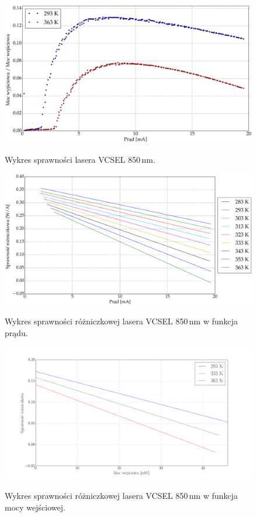 \documentclass[a4paper, portrait,12pt]{report}
\begin{document}
\begin{figure}
\center
  \includegraphics[scale=0.30]{plot_vcsel850/plot_eff.eps}
  \label{rys1}
  \caption{Wykres sprawności lasera VCSEL 850\,nm.} 
\end{figure}
\begin{figure}
\center
  \includegraphics[scale=0.30]{plot_vcsel850/plot_eff_all_via_current.eps}
  \label{rys1}
  \caption{Wykres sprawności różniczkowej lasera VCSEL 850\,nm w funkcja prądu.} 
\end{figure}
\begin{figure}
\center
  \includegraphics[scale=0.30]{plot_vcsel850/plot_slope_eff_via_power.png}
  \label{rys1}
  \caption{Wykres sprawności różniczkowej lasera VCSEL 850\,nm w funkcja mocy wejściowej.} 
\end{figure}
\end{document}
